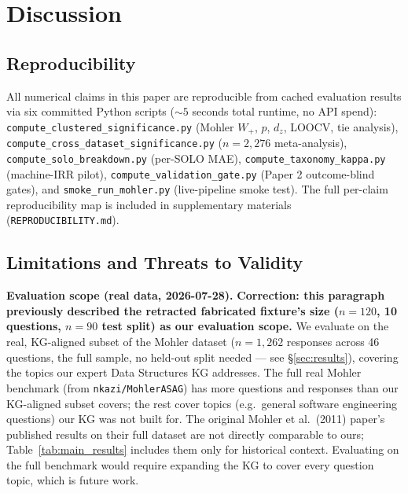 \documentclass[conference]{IEEEtran}
\begin{document}
\section{Discussion}
\label{sec:discussion}

\subsection{Reproducibility}

All numerical claims in this paper are reproducible from cached evaluation
results via six committed Python scripts ($\sim 5$ seconds total runtime,
no API spend): \texttt{compute\_clustered\_significance.py} (Mohler $W_+$,
$p$, $d_z$, LOOCV, tie analysis), \texttt{compute\_cross\_dataset\_significance.py}
($n=2{,}276$ meta-analysis), \texttt{compute\_solo\_breakdown.py}
(per-SOLO MAE), \texttt{compute\_taxonomy\_kappa.py} (machine-IRR pilot),
\texttt{compute\_validation\_gate.py} (Paper 2 outcome-blind gates), and
\texttt{smoke\_run\_mohler.py} (live-pipeline smoke test). The full
per-claim reproducibility map is included in supplementary materials
(\texttt{REPRODUCIBILITY.md}).

\subsection{Limitations and Threats to Validity}
\label{sec:limitations}

\textbf{Evaluation scope (real data, 2026-07-28).} \textbf{Correction:
this paragraph previously described the retracted fabricated fixture's
size ($n=120$, 10 questions, $n=90$ test split) as our evaluation
scope.} We evaluate on the real, KG-aligned subset of the Mohler
dataset ($n = 1{,}262$ responses across 46 questions, the full sample,
no held-out split needed --- see \S\ref{sec:results}), covering the
topics our expert Data Structures KG addresses. The full real Mohler
benchmark (from \texttt{nkazi/MohlerASAG}) has more questions and
responses than our KG-aligned subset covers; the rest cover topics
(e.g.\ general software engineering questions) our KG was not built
for. The original Mohler et al.\ (2011) paper's published results on
their full dataset are not directly comparable to ours;
Table~\ref{tab:main_results} includes them only for historical context.
Evaluating on the full benchmark would require expanding the KG to
cover every question topic, which is future work.
\end{document}
